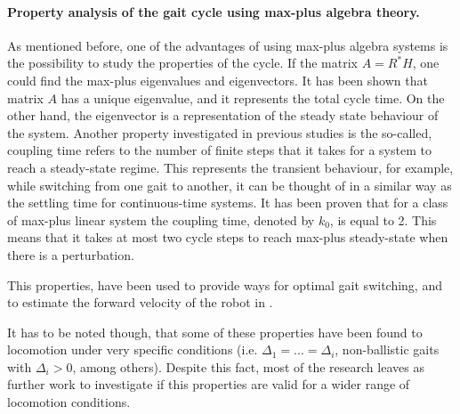 \documentclass[main.tex]{subfiles}
\begin{document}
\paragraph{Property analysis of the gait cycle using max-plus algebra theory.}As mentioned before, one of the advantages of using max-plus algebra systems is the possibility to study the properties of the cycle. 
If the matrix $A = R^*H$, one could find the max-plus eigenvalues and eigenvectors. It has been shown that matrix $A$ has a unique eigenvalue, and it represents the total cycle time. On the other hand, the eigenvector is a representation of the steady state behaviour of the system. Another property investigated in previous studies is the so-called, coupling time refers to the number of finite steps that it takes for a system to reach a steady-state regime. This represents the transient behaviour, for example, while switching from one gait to another, it can be thought of in a similar way as the settling time for continuous-time systems. It has been proven that for a class of max-plus linear system the coupling time, denoted by $k_0$, is equal to 2. This means that it takes at most two cycle steps to reach max-plus steady-state when there is a perturbation.

This properties, have been used to provide ways for optimal gait switching, and to estimate the forward velocity of the robot in \cite{Lopes2009}.

It has to be noted though, that some of these properties have been found to locomotion under very specific conditions (i.e. $\Delta_1=...=\Delta_i$, non-ballistic gaits with $\Delta_i > 0$, among others). Despite this fact, most of the research leaves as further work to investigate if this properties are valid for a wider range of locomotion conditions.
\end{document}
